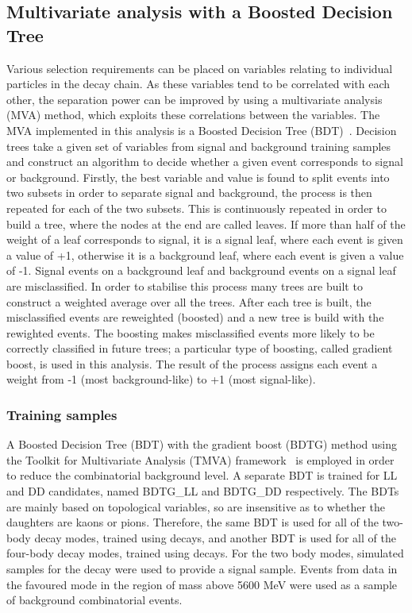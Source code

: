 \subsection{Multivariate analysis with a Boosted Decision Tree}
\label{sec:selection:bdt}

Various selection requirements can be placed on variables relating to individual particles in the decay chain. As these variables tend to be correlated with each other, the separation power can be improved by using a multivariate analysis (MVA) method, which exploits these correlations between the variables. The MVA implemented in this analysis is a Boosted Decision Tree (BDT)~\cite{Breiman}. Decision trees take a given set of variables from signal and background training samples and construct an algorithm to decide whether a given event corresponds to signal or background. Firstly, the best variable and value is found to split events into two subsets in order to separate signal and background, the process is then repeated for each of the two subsets. This is continuously repeated in order to build a tree, where the nodes at the end are called leaves. If more than half of the weight of a leaf corresponds to signal, it is a signal leaf, where each event is given a value of +1, otherwise it is a background leaf, where each event is given a value of -1. Signal events on a background leaf and background events on a signal leaf are misclassified. In order to stabilise this process many trees are built to construct a weighted average over all the trees. After each tree is built, the misclassified events are reweighted (boosted) and a new tree is build with the rewighted events. The boosting makes misclassified events more likely to be correctly classified in future trees; a particular type of boosting, called gradient boost, is used in this analysis. The result of the process assigns each event a weight from -1 (most background-like) to +1 (most signal-like). 

\subsubsection{Training samples}

A Boosted Decision Tree (BDT) with the gradient boost (BDTG) method using the Toolkit for Multivariate Analysis (TMVA) framework~\cite{TMVA} is employed in order to reduce the combinatorial background level. A separate BDT is trained for LL and DD candidates, named BDTG\_LL and BDTG\_DD respectively. The BDTs are mainly based on topological variables, so are insensitive as to whether the \Dz daughters are kaons or pions. Therefore, the same BDT is used for all of the two-body \Dz decay modes, trained using \kpi decays, and another BDT is used for all of the four-body \Dz decay modes, trained using \kpipipi decays. For the two body modes, simulated samples for the decay \kpi were used to provide a signal sample. Events from data in the favoured \kpi mode in the region of \Bm mass above 5600 MeV were used as a sample of background combinatorial events. 

